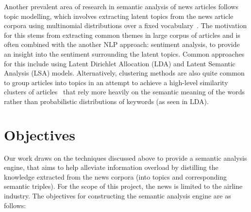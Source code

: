 Another prevalent area of research in semantic analysis of news articles follows topic modelling, which involves extracting latent topics from the news article corpora using multinomial distributions over a fixed vocabulary~\cite{nouns_only_lda}. The motivation for this stems from extracting common themes in large corpus of articles and is often combined with the another NLP approach: sentiment analysis, to provide an insight into the sentiment surrounding the latent topics. Common approaches for this include using Latent Dirichlet Allocation (LDA) and Latent Semantic Analysis (LSA) models. Alternatively, clustering methods are also quite common to group articles into topics in an attempt to achieve a high-level similarity clusters of articles~\cite{clustering_intro} that rely more heavily on the semantic meaning of the words rather than probabilistic distributions of keywords (as seen in LDA). 

\section{Objectives} \label{objectives}

Our work draws on the techniques discussed above to provide a semantic analysis engine, that aims to help alleviate information overload by distilling the knowledge extracted from the news corpora (into topics and corresponding semantic triples). For the scope of this project, the news is limited to the airline industry. The objectives for constructing the semantic analysis engine are as follows: 




